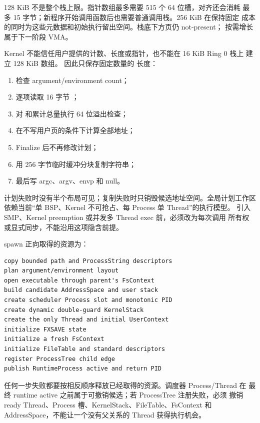 128 KiB 不是整个栈上限。指针数组最多需要 515 个 64 位槽，对齐还会消耗
最多 15 字节；新程序开始调用函数后也需要普通调用栈。256 KiB 在保持固定
成本的同时为这些元数据和初始执行留出空间。栈底下方页仍 not-present；
按需增长属于下一阶段 VMA。

Kernel 不能信任用户提供的计数、长度或指针，也不能在 16 KiB Ring 0 栈上
建立 128 KiB 数组。 因此只保存固定数量的
 长度：

\begin{enumerate}
  \item 检查 argument/environment count；
  \item 逐项读取 16 字节 ；
  \item 对  和累计总量执行 64 位溢出检查；
  \item 在不写用户页的条件下计算全部地址；
  \item Finalize 后不再修改计划；
  \item 用 256 字节临时缓冲分块复制字符串；
  \item 最后写 argc、argv、envp 和 null。
\end{enumerate}

计划失败时没有半个布局可见；复制失败时只销毁候选地址空间。全局计划工作区
依赖当前“单 BSP、Kernel 不可抢占、每 Process 单 Thread”的执行模型。
引入 SMP、Kernel preemption 或并发多 Thread exec 前，必须改为每次调用
所有权或显式同步，不能沿用这项隐含前提。

spawn 正向取得的资源为：

\begin{lstlisting}[caption={spawn 的正向所有权链}]
copy bounded path and ProcessString descriptors
plan argument/environment layout
open executable through parent's FsContext
build candidate AddressSpace and user stack
create scheduler Process slot and monotonic PID
create dynamic double-guard KernelStack
create the only Thread and initial UserContext
initialize FXSAVE state
initialize a fresh FsContext
initialize FileTable and standard descriptors
register ProcessTree child edge
publish RuntimeProcess active and return PID
\end{lstlisting}

任何一步失败都要按相反顺序释放已经取得的资源。调度器 Process/Thread 在
最终 runtime active 之前属于可撤销候选；若 ProcessTree 注册失败，必须
撤销 ready Thread、Process 槽、KernelStack、FileTable、FsContext 和
AddressSpace，不能让一个没有父关系的 Thread 获得执行机会。


